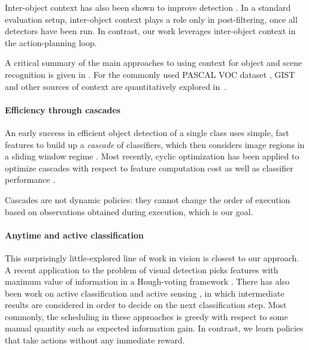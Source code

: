 Inter-object context has also been shown to improve detection \cite{Torralba2004}.
In a standard evaluation setup, inter-object context plays a role only in post-filtering, once all detectors have been run.
In contrast, our work leverages inter-object context in the action-planning loop.

A critical summary of the main approaches to using context for object and scene recognition is given in \cite{Galleguillos2010}.
For the commonly used PASCAL VOC dataset \cite{pascal-voc-2010}, GIST and other sources of context are quantitatively explored in~\cite{Divvala2009}.

\paragraph{Efficiency through cascades}
An early success in efficient object detection of a single class uses simple, fast features to build up a \emph{cascade} of classifiers, which then considers image regions in a sliding window regime \cite{Viola2004}.
Most recently, cyclic optimization has been applied to optimize cascades with respect to feature computation cost as well as classifier performance \cite{Chen-AISTATS-2012}.

Cascades are not dynamic policies: they cannot change the order of execution based on observations obtained during execution, which is our goal.

\paragraph{Anytime and active classification}
This surprisingly little-explored line of work in vision is closest to our approach.
A recent application to the problem of visual detection picks features with maximum value of information in a Hough-voting framework \cite{Vijayanarasimhan2010}.
There has also been work on active classification \cite{Gao-NIPS-2011} and active sensing \cite{Yu2009}, in which intermediate results are considered in order to decide on the next classification step.
Most commonly, the scheduling in these approaches is greedy with respect to some manual quantity such as expected information gain.
In contrast, we learn policies that take actions without any immediate reward.
